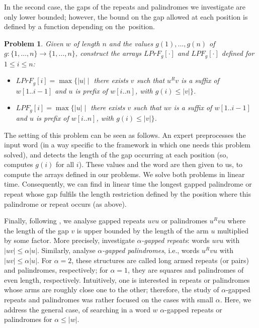 \documentclass[final]{dmtcs-episciences}
\newcommand{\ra}{\rightarrow}
\newcommand{\LPF}{{\mathit{LPrF}}}
\newcommand{\LPdF}{{\mathit{LPF}}}
\newtheorem{problem}{Problem}
\begin{document}
In the second case, the gaps of the repeats and palindromes we investigate are only lower bounded; however, the bound on the gap allowed at each position is defined by a function depending on the~position.
\begin{problem}\label{LPFg(i)}
Given $w$ of length $n$ and the values $g(1),\ldots,g(n)$ of $g:\{1,\ldots,n\}\ra \{1,\ldots,n\}$, construct the arrays $\LPF_{g}[\cdot]$ and $\LPdF_{g}[\cdot]$ defined for $1\leq i\leq n$:
\begin{itemize}
\item[a.]$\LPF_{g}[i]=\max\{|u|\mid$  there exists $v$ such that $u^Rv$ is a suffix of $w[1..i-1]$ and $u$ is prefix of $w[i..n]$, with $g(i)\leq |v|\}$.
\item[b.]$\LPdF_{g}[i]=\max\{|u|\mid$  there exists $v$ such that $uv$ is a suffix of $w[1..i-1]$ and $u$ is prefix of $w[i..n]$, with $g(i)\leq |v|\}$.
\end{itemize}
\end{problem}
The setting of this problem can be seen as follows. An expert preprocesses the input word (in a way specific to the framework in which one needs this problem solved), and detects the length of the gap occurring at each position (so, computes $g(i)$ for all $i$). These values and the word are then given to us, to compute the arrays defined in our problems. We solve both problems in linear time. Consequently, we can find in linear time the longest gapped palindrome or repeat whose gap fulfils the length restriction defined by the position where this palindrome or repeat occurs (as above).

Finally, following \cite{KK09,KolpakovPPK14}, we analyse gapped repeats $uvu$ or palindromes $u^Rvu$ where the length of the gap $v$ is upper bounded by the length of the arm $u$ multiplied by some factor. More precisely, \cite{KolpakovPPK14} investigate {\em $\alpha$-gapped repeats}: words $uvu$ with $|uv|\leq \alpha|u|$. Similarly, \cite{KK09} analyse {\em $\alpha$-gapped palindromes}, i.e., words $u^Rvu$ with $|uv|\leq \alpha|u|$.  For $\alpha=2$, these structures are called long armed repeats (or pairs) and palindromes, respectively; for $\alpha=1$, they are squares and palindromes of even length, respectively. Intuitively, one is interested in repeats or palindromes whose arms are roughly close one to the other; therefore, the study of $\alpha$-gapped repeats and palindromes was rather focused on the cases with small $\alpha$. Here, we address the general case, of searching in a word $w$ $\alpha$-gapped repeats or palindromes for $\alpha\leq |w|$.
\end{document}
